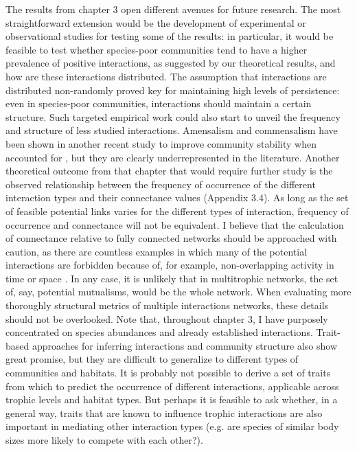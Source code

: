 The results from chapter 3 open different avenues for future research. The most straightforward extension would be the development of experimental or observational studies for testing some of the results: in particular, it would be feasible to test whether species-poor communities tend to have a higher prevalence of positive interactions, as suggested by our theoretical results, and how are these interactions distributed. The assumption that interactions are distributed non-randomly proved key for maintaining high levels of persistence: even in species-poor communities, interactions should maintain a certain structure. Such targeted empirical work could also start to unveil the frequency and structure of less studied interactions. Amensalism and commensalism have been shown in another recent study to improve community stability when accounted for \citep{Mougi2016a}, but they are clearly underrepresented in the literature. Another theoretical outcome from that chapter that would require further study is the observed relationship between the frequency of occurrence of the different interaction types and their connectance values (Appendix 3.4). As long as the set of feasible potential links varies for the different types of interaction, frequency of occurrence and connectance will not be equivalent. I believe that the calculation of connectance relative to fully connected networks should be approached with caution, as there are countless examples in which many of the potential interactions are forbidden because of, for example, non-overlapping activity in time or space \citep{Yang2010,Osorio2018}. In any case, it is unlikely that in multitrophic networks, the set of, say, potential mutualisms, would be the whole network. When evaluating more thoroughly structural metrics of multiple interactions networks, these details should not be overlooked. Note that, throughout chapter 3, I have purposely concentrated on species abundances and already established interactions. Trait-based approaches for inferring interactions \citep{Morales-Castilla2015, Bartomeus2016} and community structure \citep{Laigle2018} also show great promise, but they are difficult to generalize to different types of communities and habitats. It is probably not possible to derive a set of traits from which to predict the occurrence of different interactions, applicable across trophic levels and habitat types. But perhaps it is feasible to ask whether, in a general way, traits that are known to influence trophic interactions are also important in mediating other interaction types (e.g. are species of similar body sizes more likely to compete with each other?).

